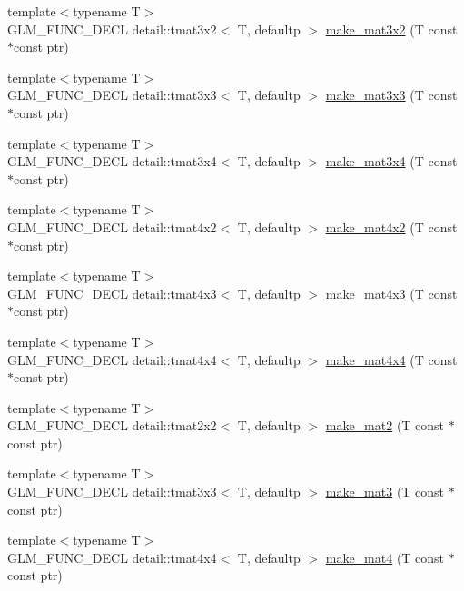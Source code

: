 \begin{CompactItemize}
{\footnotesize template$<$typename T$>$ }\\GLM\_\-FUNC\_\-DECL detail::tmat3x2$<$ T, defaultp $>$ \hyperlink{group__gtc__type__ptr_g6c7d94e71f8df512fca44427311baeae}{make\_\-mat3x2} (T const $\ast$const ptr)
\item 
{\footnotesize template$<$typename T$>$ }\\GLM\_\-FUNC\_\-DECL detail::tmat3x3$<$ T, defaultp $>$ \hyperlink{group__gtc__type__ptr_g206b172296286d333b0ff92e77b28b66}{make\_\-mat3x3} (T const $\ast$const ptr)
\item 
{\footnotesize template$<$typename T$>$ }\\GLM\_\-FUNC\_\-DECL detail::tmat3x4$<$ T, defaultp $>$ \hyperlink{group__gtc__type__ptr_g81d4d38acbaded29fb07ca282f089122}{make\_\-mat3x4} (T const $\ast$const ptr)
\item 
{\footnotesize template$<$typename T$>$ }\\GLM\_\-FUNC\_\-DECL detail::tmat4x2$<$ T, defaultp $>$ \hyperlink{group__gtc__type__ptr_gc253e8157af1e4ec366c80d4bd90cbb2}{make\_\-mat4x2} (T const $\ast$const ptr)
\item 
{\footnotesize template$<$typename T$>$ }\\GLM\_\-FUNC\_\-DECL detail::tmat4x3$<$ T, defaultp $>$ \hyperlink{group__gtc__type__ptr_gc375314134d9b3736395a4eda2602590}{make\_\-mat4x3} (T const $\ast$const ptr)
\item 
{\footnotesize template$<$typename T$>$ }\\GLM\_\-FUNC\_\-DECL detail::tmat4x4$<$ T, defaultp $>$ \hyperlink{group__gtc__type__ptr_g74e671ae9dc7e5e8f21aa44ea263d76e}{make\_\-mat4x4} (T const $\ast$const ptr)
\item 
{\footnotesize template$<$typename T$>$ }\\GLM\_\-FUNC\_\-DECL detail::tmat2x2$<$ T, defaultp $>$ \hyperlink{group__gtc__type__ptr_g08f35700be4d2e627da4d894edfa1b60}{make\_\-mat2} (T const $\ast$const ptr)
\item 
{\footnotesize template$<$typename T$>$ }\\GLM\_\-FUNC\_\-DECL detail::tmat3x3$<$ T, defaultp $>$ \hyperlink{group__gtc__type__ptr_g63c04b2cd2367a06e9817a66b5025662}{make\_\-mat3} (T const $\ast$const ptr)
\item 
{\footnotesize template$<$typename T$>$ }\\GLM\_\-FUNC\_\-DECL detail::tmat4x4$<$ T, defaultp $>$ \hyperlink{group__gtc__type__ptr_g082261bc3bf4a6d320d6beaebcbaf1db}{make\_\-mat4} (T const $\ast$const ptr)

\end{CompactItemize}
